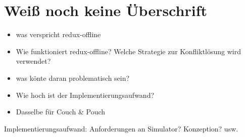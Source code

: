 \chapter{\label{chap:implementierung}Weiß noch keine Überschrift}
\begin{itemize}
	\item was verspricht redux-offline
	\item Wie funktioniert redux-offline? Welche Strategie zur Konfliktlösung wird verwendet?
	\item was könte daran problematisch sein?
	\item Wie hoch ist der Implementierungsaufwand?
	\item Dasselbe für Couch \& Pouch
\end{itemize}

Implementierungsaufwand: Anforderungen an Simulator? Konzeption? usw.
